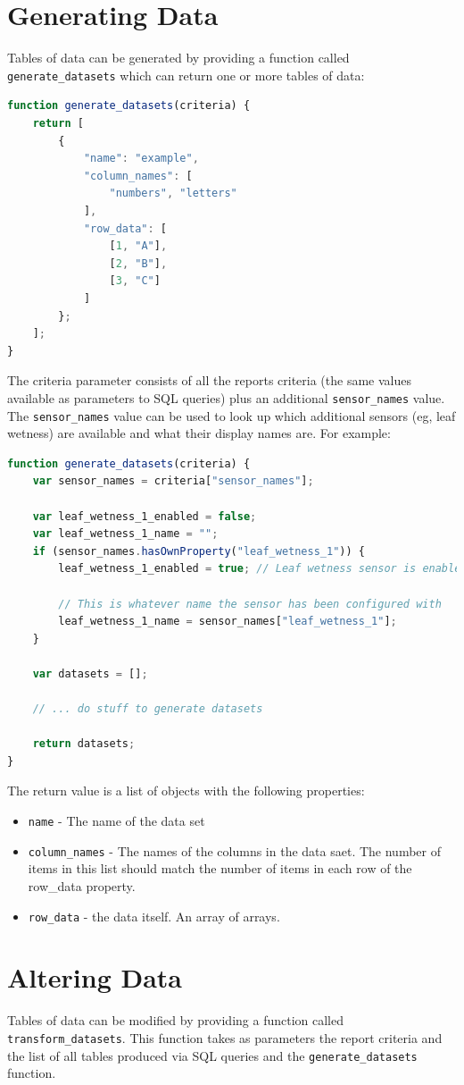 \documentclass[a4paper,10pt]{book}
\begin{document}
\section{Generating Data}
Tables of data can be generated by providing a function called \verb|generate_datasets| which can return one or more tables of data:

\begin{lstlisting}[language=javascript]
function generate_datasets(criteria) {
	return [
		{
			"name": "example",
			"column_names": [
				"numbers", "letters"
			],
			"row_data": [
				[1, "A"],
				[2, "B"],
				[3, "C"]
			]
		};
	];
}
\end{lstlisting}

The criteria parameter consists of all the reports criteria (the same values available as parameters to SQL queries) plus an additional \verb|sensor_names| value. The \verb|sensor_names| value can be used to look up which additional sensors (eg, leaf wetness) are available and what their display names are. For example:
\begin{lstlisting}[language=javascript]
function generate_datasets(criteria) {
	var sensor_names = criteria["sensor_names"];
	
	var leaf_wetness_1_enabled = false;
	var leaf_wetness_1_name = "";
	if (sensor_names.hasOwnProperty("leaf_wetness_1")) {
		leaf_wetness_1_enabled = true; // Leaf wetness sensor is enabled

		// This is whatever name the sensor has been configured with
		leaf_wetness_1_name = sensor_names["leaf_wetness_1"]; 
	}

	var datasets = [];

	// ... do stuff to generate datasets

	return datasets;
}
\end{lstlisting}

The return value is a list of objects with the following properties:
\begin{itemize}
\item \verb|name| - The name of the data set
\item \verb|column_names| - The names of the columns in the data saet. The number of items in this list should match the number of items in each row of the row\_data property.
\item \verb|row_data| - the data itself. An array of arrays.
\end{itemize}

\section{Altering Data}
Tables of data can be modified by providing a function called \verb|transform_datasets|. This function takes as parameters the report criteria and the list of all tables produced
via SQL queries and the \verb|generate_datasets| function.
\end{document}
